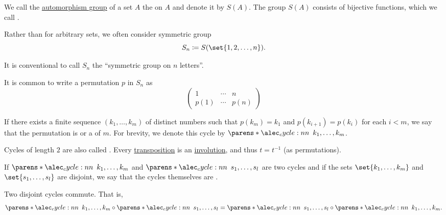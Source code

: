 \begin{definition}\label{def:symmetric_group}
  We call the \hyperref[def:automorphism_group]{automorphism group} of a set \( A \) the  on \( A \) and denote it by \( S(A) \). The group \( S(A) \) consists of bijective functions, which we call .

  Rather than for arbitrary sets, we often consider symmetric group
  \begin{equation*}
    S_n \coloneqq S(\set{ 1, 2, \ldots, n }).
  \end{equation*}

  It is conventional to call \( S_n \) the \enquote{symmetric group on \( n \) letters}.

  \begin{thmenum}
     It is common to write a permutation \( p \) in \( S_n \) as
    \begin{equation*}
      \begin{pmatrix}
        1    & \cdots & n \\
        p(1) & \cdots & p(n)
      \end{pmatrix}
    \end{equation*}

     If there exists a finite sequence \( (k_1, \ldots, k_m) \) of distinct numbers such that \( p(k_m) = k_1 \) and \( p(k_{i+1}) = p(k_i) \) for each \( i < m \), we say that the permutation is  or a  of  \( m \). For brevity, we denote this cycle by \( \cycle{k_1, \ldots, k_m} \).

    Cycles of length \( 2 \) are also called . Every \hyperref[def:symmetric_group/cycle]{transposition} is an \hyperref[def:set_with_involution]{involution}, and thus \( t = t^{-1} \) (as permutations).

     If \( \cycle{k_1, \ldots, k_m} \) and \( \cycle{s_1, \ldots, s_l} \) are two cycles and if the sets \( \set{ k_1, \ldots, k_m } \) and \( \set{ s_1, \ldots, s_l } \) are disjoint, we say that the cycles themselves are .

    Two disjoint cycles commute. That is,
    \begin{equation*}
      \cycle{k_1, \ldots, k_m} \bincirc \cycle{s_1, \ldots, s_l} = \cycle{s_1, \ldots, s_l} \bincirc \cycle{k_1, \ldots, k_m}.
    \end{equation*}
  \end{thmenum}
\end{definition}

